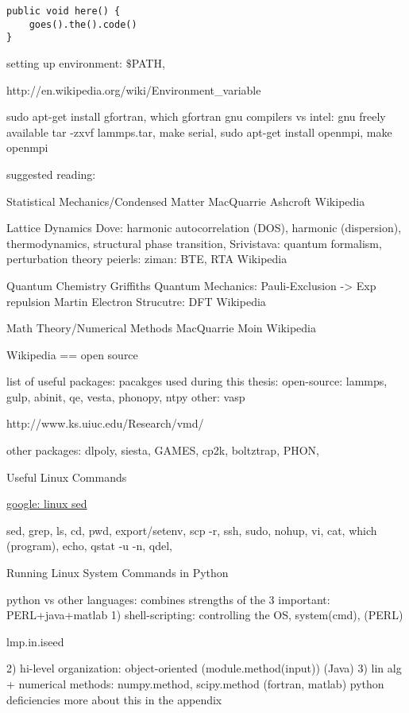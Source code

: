 \lstset{language=Python}
\begin{lstlisting}[label=some-code,caption=Some Code]
public void here() {
	goes().the().code()
}
\end{lstlisting}




setting up environment: $\$$PATH, 

http://en.wikipedia.org/wiki/Environment_variable

sudo apt-get install gfortran, which gfortran 
gnu compilers vs intel: gnu freely available
tar -zxvf lammps.tar, make serial, sudo apt-get install openmpi, make openmpi

suggested reading:

Statistical Mechanics/Condensed Matter
MacQuarrie
Ashcroft
Wikipedia

Lattice Dynamics
Dove: harmonic autocorrelation (DOS), harmonic (dispersion), 
thermodynamics, structural phase transition, 
Srivistava: quantum formalism, perturbation theory
peierls:
ziman: BTE, RTA
Wikipedia

Quantum Chemistry
Griffiths Quantum Mechanics: Pauli-Exclusion -> Exp repulsion 
Martin Electron Strucutre: DFT
Wikipedia

Math Theory/Numerical Methods
MacQuarrie
Moin
Wikipedia



Wikipedia == open source


list of useful packages: 
pacakges used during this thesis: 
open-source: lammps, gulp, abinit, qe, vesta, phonopy, ntpy
other: vasp

http://www.ks.uiuc.edu/Research/vmd/

other packages: dlpoly, siesta, GAMES, cp2k, boltztrap, PHON, 

Useful Linux Commands

\href{https://www.google.com/search?q=linux+sed}
{google: linux sed}


sed, grep, ls, cd, pwd, export/setenv, scp -r, ssh, sudo, nohup, 
vi, cat, which (program), echo, qstat -u -n, qdel, 

Running Linux System Commands in Python
 
python vs other languages: combines strengths of the 3 important:
PERL+java+matlab
1) shell-scripting: controlling the OS, system(cmd), (PERL) 

lmp.in.iseed



2) hi-level organization: object-oriented (module.method(input)) (Java)
3) lin alg + numerical methods: numpy.method, scipy.method (fortran, matlab)
python deficiencies
more about this in the appendix

